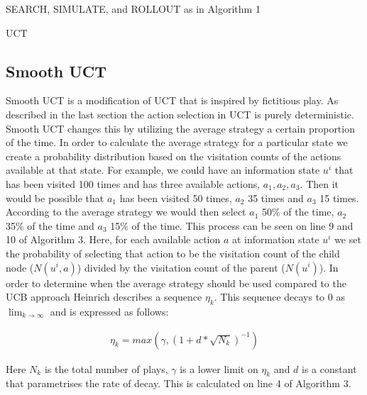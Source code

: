 \begin{algorithm}[H]
    \DontPrintSemicolon
    \LinesNumbered
    SEARCH, SIMULATE, and ROLLOUT as in Algorithm 1\;
    \caption{UCT}
\end{algorithm}

\subsection{Smooth UCT}\label{subsec:smoothUCT}
Smooth UCT is a modification of UCT that is inspired by fictitious play\citep{heinrich2017reinforcement}.
As described in the last section the action selection in UCT is purely deterministic.
Smooth UCT changes this by utilizing the average strategy a certain proportion of the time.
In order to calculate the average strategy for a particular state we create a 
probability distribution based on the visitation counts of the actions 
available at that state.
For example, we could have an information state $u^i$ that has been visited 100 times
and has three available actions, $a_1, a_2, a_3$.
Then it would be possible that $a_1$ has been visited 50 times, $a_2$ 35 times 
and $a_3$ 15 times.
According to the average strategy we would then select $a_1$ 50\% of the time, 
$a_2$ 35\% of the time and $a_3$ 15\% of the time.
This process can be seen on line 9 and 10 of Algorithm 3.
Here, for each available action $a$ at information state $u^i$ we set the
probability of selecting that action to be the visitation count of the child node ($N(u^i,a)$)
divided by the visitation count of the parent ($N(u^i)$).
In order to determine when the average strategy should be used compared to the 
UCB approach Heinrich describes a sequence $\eta_k$.
This sequence decays to 0 as $\lim_{k \to \infty}$ and is expressed as follows:

\begin{align}
\eta_k = max(\gamma, (1 + d * \sqrt{N_k})^{-1})
\end{align}

Here $N_k$ is the total number of plays, $\gamma$ is a lower limit on $\eta_k$
and $d$ is a constant that parametrises the rate of decay.
This is calculated on line 4 of Algorithm 3.

